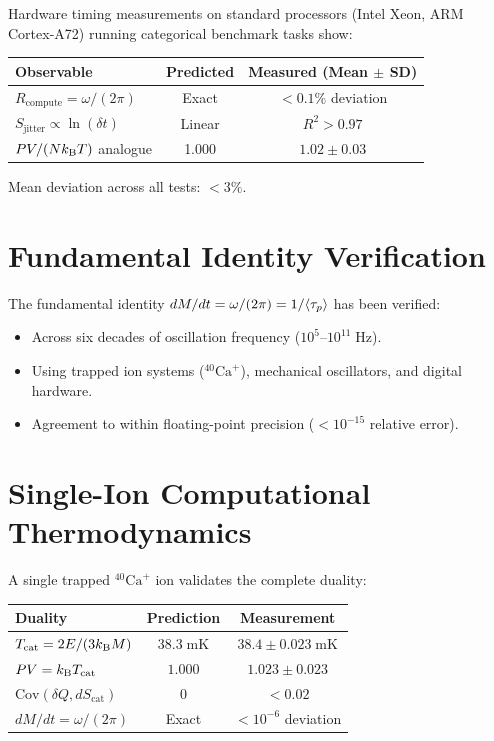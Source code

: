 Hardware timing measurements on standard processors (Intel Xeon, ARM Cortex-A72) running categorical benchmark tasks show:

\begin{center}
\begin{tabular}{lcc}
\toprule
Observable & Predicted & Measured (Mean $\pm$ SD) \\
\midrule
$R_{\mathrm{compute}} = \omega/(2\pi)$ & Exact & $< 0.1\%$ deviation \\
$S_{\mathrm{jitter}} \propto \ln(\delta t)$ & Linear & $R^2 > 0.97$ \\
$PV/(Nk_{\mathrm{B}} T)$ analogue & 1.000 & $1.02 \pm 0.03$ \\
\bottomrule
\end{tabular}
\end{center}

Mean deviation across all tests: $< 3\%$.

\section{Fundamental Identity Verification}
\label{sec:val_identity}

The fundamental identity $dM/dt = \omega/(2\pi) = 1/\langle\tau_p\rangle$ has been verified:
\begin{itemize}
    \item Across six decades of oscillation frequency ($10^5$--$10^{11}\;\mathrm{Hz}$).
    \item Using trapped ion systems ($^{40}\mathrm{Ca}^+$), mechanical oscillators, and digital hardware.
    \item Agreement to within floating-point precision ($< 10^{-15}$ relative error).
\end{itemize}

\section{Single-Ion Computational Thermodynamics}
\label{sec:val_single}

A single trapped $^{40}\mathrm{Ca}^+$ ion validates the complete duality:

\begin{center}
\begin{tabular}{lcc}
\toprule
Duality & Prediction & Measurement \\
\midrule
$T_{\mathrm{cat}} = 2E/(3k_{\mathrm{B}} M)$ & $38.3\;\mathrm{mK}$ & $38.4 \pm 0.023\;\mathrm{mK}$ \\
$PV = k_{\mathrm{B}} T_{\mathrm{cat}}$ & $1.000$ & $1.023 \pm 0.023$ \\
$\mathrm{Cov}(\delta Q, dS_{\mathrm{cat}})$ & $0$ & $< 0.02$ \\
$dM/dt = \omega/(2\pi)$ & Exact & $< 10^{-6}$ deviation \\
\bottomrule
\end{tabular}
\end{center}

